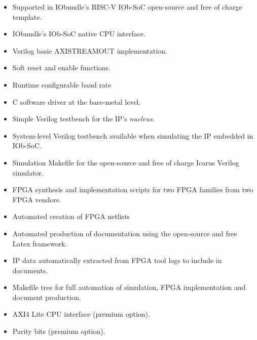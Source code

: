 \begin{itemize}
\item Supported in IObundle's RISC-V IOb-SoC open-source and free of charge template.
\item IObundle's IOb-SoC native CPU interface.
\item Verilog basic AXISTREAMOUT implementation.
\item Soft reset and enable functions.
\item Runtime configurable baud rate
\item C software driver at the bare-metal level.
\item Simple Verilog testbench for the IP's {\em nucleus}.
\item System-level Verilog testbench available when simulating the IP embedded in IOb-SoC.
\item Simulation Makefile for the open-source and free of charge Icarus Verilog simulator.
\item FPGA synthesis and implementation scripts for two FPGA families from two FPGA vendors.
\item Automated creation of FPGA netlists
\item Automated production of documentation using the open-source and free Latex framework.
\item IP data automatically extracted from FPGA tool logs to include in documents.
\item Makefile tree for full automation of simulation, FPGA implementation and document production.
\item AXI4 Lite CPU interface (premium option).
\item Parity bits  (premium option).
\end{itemize}
